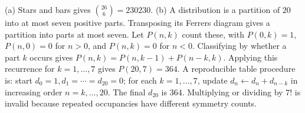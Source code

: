 (a) Stars and bars gives $\binom{26}{6}=\boxed{230230}$. (b) A distribution is a partition of $20$ into at most seven positive parts. Transposing its Ferrers diagram gives a partition into parts at most seven. Let $P(n,k)$ count these, with $P(0,k)=1$, $P(n,0)=0$ for $n>0$, and $P(n,k)=0$ for $n<0$. Classifying by whether a part $k$ occurs gives $P(n,k)=P(n,k-1)+P(n-k,k)$. Applying this recurrence for $k=1,\ldots,7$ gives $P(20,7)=\boxed{364}$. A reproducible table procedure is: start $d_0=1,d_1=\cdots=d_{20}=0$; for each $k=1,\ldots,7$, update $d_n\leftarrow d_n+d_{n-k}$ in increasing order $n=k,\ldots,20$. The final $d_{20}$ is $364$. Multiplying or dividing by $7!$ is invalid because repeated occupancies have different symmetry counts.

